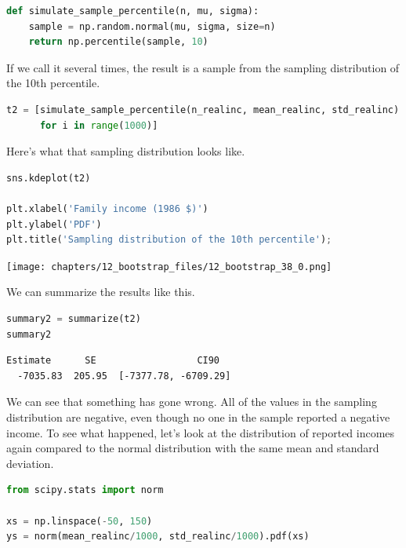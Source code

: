 \begin{lstlisting}[language=Python,style=source]
def simulate_sample_percentile(n, mu, sigma):
    sample = np.random.normal(mu, sigma, size=n)
    return np.percentile(sample, 10)
\end{lstlisting}

If we call it several times, the result is a sample from the sampling
distribution of the 10th percentile.

\begin{lstlisting}[language=Python,style=source]
t2 = [simulate_sample_percentile(n_realinc, mean_realinc, std_realinc)
      for i in range(1000)]
\end{lstlisting}

Here's what that sampling distribution looks like.

\begin{lstlisting}[language=Python,style=source]
sns.kdeplot(t2)

plt.xlabel('Family income (1986 $)')
plt.ylabel('PDF')
plt.title('Sampling distribution of the 10th percentile');
\end{lstlisting}

\begin{center}
\texttt{[image: chapters/12\_bootstrap\_files/12\_bootstrap\_38\_0.png]}
\end{center}

We can summarize the results like this.

\begin{lstlisting}[language=Python,style=source]
summary2 = summarize(t2)
summary2
\end{lstlisting}

\begin{lstlisting}[style=output]
  Estimate      SE                  CI90
  -7035.83  205.95  [-7377.78, -6709.29]
\end{lstlisting}

We can see that something has gone wrong. All of the values in the
sampling distribution are negative, even though no one in the sample
reported a negative income. To see what happened, let's look at the
distribution of reported incomes again compared to the normal
distribution with the same mean and standard deviation.

\begin{lstlisting}[language=Python,style=source]
from scipy.stats import norm

xs = np.linspace(-50, 150)
ys = norm(mean_realinc/1000, std_realinc/1000).pdf(xs)
\end{lstlisting}

